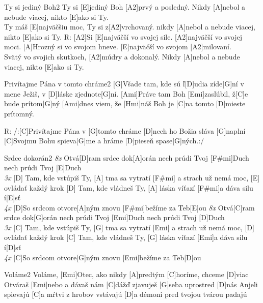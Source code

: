 \documentclass[12pt]{article}
\begin{document}
\begin{song}{Ty si jediný Boh}{2}
	Ty si [E]jediný Boh
	[A2]prvý a posledný.
	Nikdy [A]nebol a nebude viacej,
	nikto [E]ako si Ty.
	\\
	[A2]Ty máš [E]najväčšiu moc,
	Ty si z[A2]vrchovaný.
	nikdy [A]nebol a nebude viacej,
	nikto [E]ako si Ty.
	\columnbreak
	R:
	[A2]Si [E]najväčší vo svojej sile.
	[A2]najväčší vo svojej moci.
	[A]Hrozný si vo svojom hneve.
	[E]najväčší vo svojom [A2]milovaní.
	\\
	[E]Svätý vo svojich skutkoch,
	[A2]múdry a dokonalý.
	Nikdy [A]nebol a nebude viacej,
	nikto [E]ako si Ty.
\end{song}
	
\begin{song}{Privítajme Pána v tomto chráme}{2}
	[G]Všade tam, kde sú ľ[D]udia zíde[G]ní
	v mene Ježiš, v [D]láske zjednote[G]ní.
	[Ami]Práve tam Boh [Emi]zasľúbil, ž[C]e bude prítom[G]ný
	[Ami]dnes viem, že [Hmi]náš Boh je 
	[C]na tomto [D]mieste prítomný.
	
	R: /:[C]Privítajme Pána v [G]tomto chráme
	[D]nech ho Božia sláva [G]naplní
	[C]Svojmu Bohu spieva[G]me a hráme
	[D]pieseň spase[G]ných.:/
\end{song}

	
\begin{song}{Srdce dokorán}{2}
	\textit{\color{gray}8x}
	Otvá[D]ram srdce dok[A]orán
	nech prúdi Tvoj [F#mi]Duch
	nech prúdi Tvoj [E]Duch
	\\
	\textit{\color{gray}3x}
	[D] Tam, kde vstúpiš Ty, [A] tma sa vytratí
	[F#mi] a strach už nemá moc, [E] ovládať každý krok
	[D] Tam, kde vládneš Ty, [A] láska víťazí [F#mi]a dáva silu í[E]sť
	\\
	\textit{\color{gray}4x}
	[D]So srdcom otvore[A]ným
	znovu [F#mi]bežíme za Teb[E]ou
	\columnbreak
	\textit{\color{gray}8x}
	Otvá[C]ram srdce dok[G]orán
	nech prúdi Tvoj [Emi]Duch
	nech prúdi Tvoj [D]Duch
	\\
	\textit{\color{gray}3x}
	[C] Tam, kde vstúpiš Ty, [G] tma sa vytratí
	[Emi] a strach už nemá moc, [D] ovládať každý krok
	[C] Tam, kde vládneš Ty, [G] láska víťazí [Emi]a dáva silu í[D]sť
	\\
	\textit{\color{gray}4x}
	[C]So srdcom otvore[G]ným
	znovu [Emi]bežíme za Teb[D]ou
\end{song}

\begin{song}{Voláme}{2}
	Voláme, [Emi]Otec, ako nikdy [A]predtým
	[C]horíme, chceme [D]viac
	Otváraš [Emi]nebo a dávaš nám [C]dážď
	zjavuješ [G]seba uprostred [D]nás
	\columnbreak
	[Emim]Anjeli spievajú
	[C]a mŕtvi z hrobov vstávajú
	[D]a démoni pred tvojou tvárou padajú
\end{song}
\end{document}
